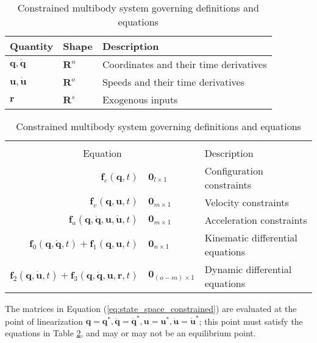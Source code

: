 \documentclass[smallcondensed]{svjour3}                     %
\begin{document}
\begin{table}[htbp]
  \centering
  \caption{Constrained multibody system governing definitions and equations}
  \label{table:assumptions}
  \begin{tabular}[c]{l l l}
    Quantity & Shape & Description\\
    \hline
    $\bm{q},\bm{\dot{q}}$ & $\mathbf{R}^n$ & Coordinates and their time
    derivatives\\
    $\bm{u}, \bm{\dot{u}}$ & $\mathbf{R}^o$ & Speeds and their time derivatives\\
    $\bm{r}$ & $\mathbf{R}^s$ & Exogenous inputs \\
  \end{tabular}
  \begin{tabular}[c]{r @{ $=$ } l l}
    \multicolumn{3}{c}{ } \\
    \multicolumn{2}{c}{Equation} & Description \\
    \hline
    $\bm{f}_{c}(\bm{q}, t)$ & $\bm{0}_{l \times 1}$ & Configuration constraints \\
    $\bm{f}_{v}(\bm{q}, \bm{u}, t)$ & $\bm{0}_{m \times 1}$ & Velocity constraints \\
    $\bm{f}_{a}(\bm{q}, \bm{\dot{q}}, \bm{u}, \bm{\dot{u}}, t)$ & $\bm{0}_{m
    \times 1}$ & Acceleration constraints \\
    $\bm{f}_{0}(\bm{q}, \bm{\dot{q}}, t) + \bm{f}_{1}(\bm{q}, \bm{u}, t)$ &
    $\bm{0}_{n \times 1}$ & Kinematic differential equations \\
    $\bm{f}_{2}(\bm{q}, \bm{\dot{u}}, t) + \bm{f}_{3}(\bm{q}, \bm{\dot{q}},
    \bm{u}, \bm{r}, t)$ & $\bm{0}_{(o - m) \times 1}$ & Dynamic differential equations
  \end{tabular}
\end{table}

The matrices in Equation (\ref{eq:state_space_constrained}) are evaluated at
the point of linearization $\bm{q}=\bm{q}^*, \bm{\dot{q}}=\bm{\dot{q}}^*,
\bm{u}=\bm{u}^*, \bm{\dot{u}}=\bm{\dot{u}}^*$; this point must satisfy the
equations in Table \ref{table:assumptions}, and may or may not be an
equilibrium point.
\end{document}
